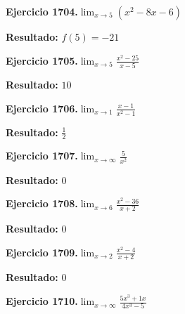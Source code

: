\documentclass[10pt,a4paper]{article}
\begin{document}
\begin{ejbox}
\textbf{Ejercicio 1704.}\quad $\lim_{x\to 5} (x^2 -8x -6)$
\end{ejbox}

\begin{solbox}
\textbf{Resultado:} \(\displaystyle f(5) = -21\)
\end{solbox}

\newpage
\begin{ejbox}
\textbf{Ejercicio 1705.}\quad $\lim_{x\to 5} \frac{x^2-25}{x-5}$
\end{ejbox}

\begin{solbox}
\textbf{Resultado:} \(\displaystyle 10\)
\end{solbox}

\begin{ejbox}
\textbf{Ejercicio 1706.}\quad $\lim_{x\to 1} \frac{x-1}{x^2-1}$
\end{ejbox}

\begin{solbox}
\textbf{Resultado:} \(\displaystyle \frac{1}{2}\)
\end{solbox}

\begin{ejbox}
\textbf{Ejercicio 1707.}\quad $\lim_{x\to \infty} \frac{5}{x^2}$
\end{ejbox}

\begin{solbox}
\textbf{Resultado:} \(\displaystyle 0\)
\end{solbox}

\newpage
\begin{ejbox}
\textbf{Ejercicio 1708.}\quad $\lim_{x\to 6} \frac{x^2-36}{x+2}$
\end{ejbox}

\begin{solbox}
\textbf{Resultado:} \(\displaystyle 0\)
\end{solbox}

\begin{ejbox}
\textbf{Ejercicio 1709.}\quad $\lim_{x\to 2} \frac{x^2-4}{x+2}$
\end{ejbox}

\begin{solbox}
\textbf{Resultado:} \(\displaystyle 0\)
\end{solbox}

\begin{ejbox}
\textbf{Ejercicio 1710.}\quad $\lim_{x\to \infty} \frac{5x^3 + 1x}{4x^3 - 5}$
\end{ejbox}
\end{document}
